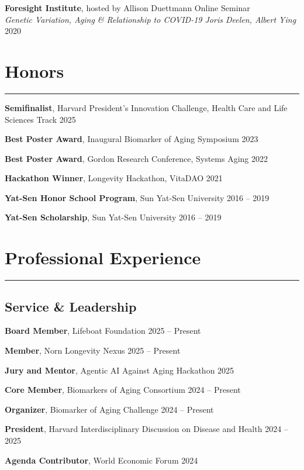 \documentclass[
  11pt,
]
{article}
\begin{document}
\textbf{Foresight Institute}, hosted by Allison Duettmann \hfill Online
Seminar\\
\emph{Genetic Variation, Aging \& Relationship to COVID-19 \textbar{}
Joris Deelen, Albert Ying} \hfill 2020

\section{Honors}\label{honors}

\hrule

\textbf{Semifinalist}, Harvard President's Innovation Challenge, Health
Care and Life Sciences Track \hfill 2025

\textbf{Best Poster Award}, Inaugural Biomarker of Aging Symposium
\hfill 2023

\textbf{Best Poster Award}, Gordon Research Conference, Systems Aging
\hfill 2022

\textbf{Hackathon Winner}, Longevity Hackathon, VitaDAO \hfill 2021

\textbf{Yat-Sen Honor School Program}, Sun Yat-Sen University
\hfill 2016 -- 2019

\textbf{Yat-Sen Scholarship}, Sun Yat-Sen University \hfill 2016 -- 2019

\section{Professional Experience}\label{professional-experience}

\hrule

\subsection{Service \& Leadership}\label{service-leadership}

\textbf{Board Member}, Lifeboat Foundation \hfill 2025 -- Present

\textbf{Member}, Norn Longevity Nexus \hfill 2025 -- Present

\textbf{Jury and Mentor}, Agentic AI Against Aging Hackathon \hfill 2025

\textbf{Core Member}, Biomarkers of Aging Consortium \hfill 2024 --
Present

\textbf{Organizer}, Biomarker of Aging Challenge \hfill 2024 -- Present

\textbf{President}, Harvard Interdisciplinary Discussion on Disease and
Health \hfill 2024 -- 2025

\textbf{Agenda Contributor}, World Economic Forum \hfill 2024
\end{document}

